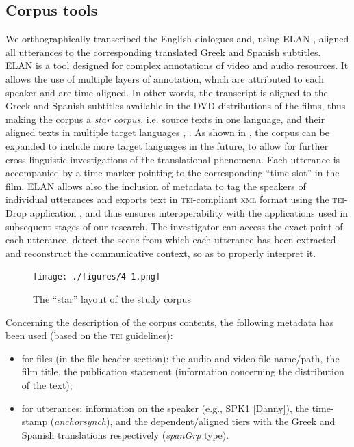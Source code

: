 \documentclass[output=paper]{LSP/langsci}
\begin{document}
\subsection{Corpus tools} \label{sec:2:3:2}

We orthographically transcribed the English dialogues and, using ELAN \citep{Brugman2004}, aligned all utterances to the corresponding translated Greek and Spanish subtitles. ELAN is a tool designed for complex annotations of video and audio resources. It allows the use of multiple layers of annotation, which are attributed to each speaker and are time-aligned. In other words, the transcript is aligned to the Greek and Spanish subtitles available in the DVD distributions of the films, thus making the corpus a \textit{star corpus}, i.e. source texts in one language, and their aligned texts in multiple target languages \citep[see][140-141]{Johansson2003}, \citep[see][260]{Saridakis2010}. As shown in , the corpus can be expanded to include more target languages in the future, to allow for further cross-linguistic investigations of the translational phenomena. Each utterance is accompanied by a time marker pointing to the corresponding “time-slot” in the film. ELAN allows also the inclusion of metadata to tag the speakers of individual utterances and exports text in \textsc{tei}-compliant \textsc{xml} format using the \textsc{tei}-Drop application \citep{Schmidt2011}, and thus ensures interoperability with the applications used in subsequent stages of our research. The investigator can access the exact point of each utterance, detect the scene from which each utterance has been extracted and reconstruct the communicative context, so as to properly interpret it.

\begin{figure}
\texttt{[image: ./figures/4-1.png]}
\caption{The “star” layout of the study corpus} \label{fig:2:1}
\end{figure}

Concerning the description of the corpus contents, the following metadata has been used (based on the \textsc{tei} guidelines):

\begin{itemize}
\item for files (in the file header section): the audio and video file name/path, the film title, the publication statement (information concerning the distribution of the text);
\item for utterances: information on the speaker (e.g., SPK1 [Danny]), the time-stamp (\textit{anchorsynch}), and the dependent/aligned tiers with the Greek and Spanish translations respectively (\textit{spanGrp} type).
\end{itemize}
\end{document}
